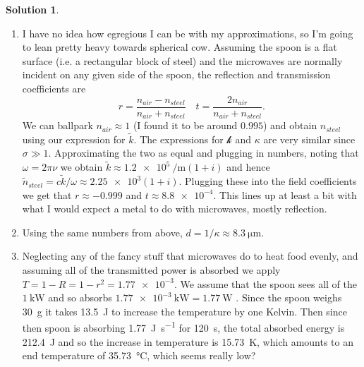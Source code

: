 \documentclass[10pt]{article}
\theoremstyle{definition}
\newtheorem{soln}{Solution}
\newcommand{\ti}[1]{\widetilde{#1}}
\begin{document}
\begin{soln}~
  \begin{enumerate}[label=(\alph*)]
    \item I have no idea how egregious I can be with my approximations, so I'm going to lean pretty heavy towards spherical cow.
          Assuming the spoon is a flat surface (i.e. a rectangular block of steel) and the microwaves are normally incident on any given side of the spoon,
          the reflection and transmission coefficients are
          $$r=\frac{n_{air}-n_{steel}}{n_{air}+n_{steel}}\quad t=\frac{2n_{air}}{n_{air}+n_{steel}}.$$
          We can ballpark $n_{air}\approx 1$ (I found it to be around $0.995$) and obtain $n_{steel}$ using our expression for
          $\ti{k}$. The expressions for $\mathcal{k}$ and $\kappa$ are very similar since $\sigma\gg 1$. Approximating the two as equal and
          plugging in numbers, noting that $\omega =2\pi\nu$ we obtain $\ti{k}\approx \qty{1.2e5}{\per\meter}(1+i)$ and hence
          $\ti{n}_{steel}=c\ti{k}/\omega\approx \num{2.25e3}(1+i)$. Plugging these into the field coefficients we get that
          $r\approx -0.999$ and $t\approx \num{8.8e-4}$. This lines up at least a bit with what I would expect a metal to do with microwaves, mostly reflection.
    \item Using the same numbers from above, $d=1/\kappa\approx \qty{8.3}{\micro\meter}$.
    \item Neglecting any of the fancy stuff that microwaves do to heat food evenly, and assuming all of the transmitted power is absorbed
          we apply $T=1-R=1-r^2=\num{1.77e-3}$. We assume that the spoon sees all of the $\qty{1}{\kilo\watt}$ and
          so absorbs $\qty{1.77e-3}{\kilo\watt}=\qty{1.77}{\watt}$ .
          Since the spoon weighs \qty{30}{\gram} it takes \qty{13.5}{\joule} to increase the temperature by one Kelvin.
          Then since then spoon is absorbing \qty{1.77}{\joule\per\second} for \qty{120}{\second}, the total absorbed energy is
          \qty{212.4}{\joule} and so the increase in temperature is \qty{15.73}{\kelvin}, which amounts to an end temperature of \qty{35.73}{\degreeCelsius},
          which seems really low?
  \end{enumerate}
\end{soln}
\end{document}
